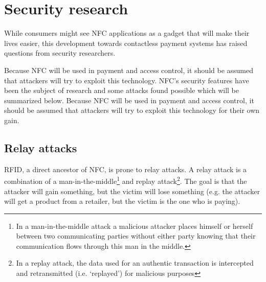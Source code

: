 \section{Security research}
\label{sec:known_vulnerabilities}

While consumers might see NFC applications as a gadget that will make their lives easier, this development towards contactless payment systems has raised questions from security researchers.

Because NFC will be used in payment and access control, it should be assumed that attackers will try to exploit this technology.
NFC's security features have been the subject of research and some attacks found possible which will be summarized below.
Because NFC will be used in payment and access control, it should be assumed that attackers will try to exploit this technology for their own gain. 


\subsection{Relay attacks}
RFID, a direct ancestor of NFC, is prone to relay attacks.
A relay attack is a combination of a man-in-the-middle\footnote{In a man-in-the-middle attack a malicious attacker places himself or herself between two communicating parties without either party knowing that their communication flows through this man in the middle.} and replay attack\footnote{In a replay attack, the data used for an authentic transaction is intercepted and retransmitted (i.e. `replayed') for malicious purposes}.
The goal is that the attacker will gain something, but the victim will lose something (e.g. the attacker will get a product from a retailer, but the victim is the one who is paying).

